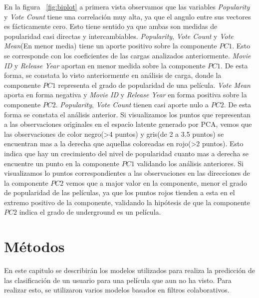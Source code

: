 \documentclass[11pt,a4paper,twoside]{thesis}
\begin{document}
En la figura ~\ref{fig:biplot} a primera vista observamos que las variables \textit{Popularity} y \textit{Vote Count} tiene una correlación muy alta, ya que el angulo entre sus vectores es fácticamente cero. Esto tiene sentido ya que ambas son medidas de popularidad casi directas y intercambiables. \textit{Popularity}, \textit{Vote Count} y \textit{Vote Mean}(En menor media) tiene un aporte positivo sobre la componente $PC1$. Esto se corresponde con los coeficientes de las cargas analizados anteriormente. \textit{Movie ID } y \textit{Release Year} aportan en menor medida sobre la componente $PC1$. De esta forma, se constata lo visto anteriormente en análisis de carga, donde la componente $PC1$ representa el grado de popularidad de una película. \textit{Vote Mean} aporta en forma negativa y \textit{Movie ID } y \textit{Release Year} en forma positiva sobre la componente $PC2$. \textit{Popularity}, \textit{Vote Count} tienen casi aporte nulo a $PC2$. De esta forma se constata el análisis anterior. Si visualizamos los puntos que representan a las observaciones originales en el espacio latente generado por PCA, vemos que las observaciones de color negro(>4 puntos) y gris(de 2 a 3.5 puntos) se encuentran mas a la derecha que aquellas coloreadas en rojo(>2 puntos). Esto indica que hay un crecimiento del nivel de popularidad cuanto mas a derecha se encuentre un punto en la componente $PC1$ validando los análisis anteriores. Si visualizamos lo puntos correspondientes a las observaciones en las direcciones de la componente $PC2$ vemos que a major valor en la componente, menor el grado de popularidad de las películas, ya que los puntos rojos tienden a esta en el extremo positivo de la componente, validando la hipótesis de que la componente $PC2$ indica el grado de underground es un película.



\chapter{Métodos}

En este capitulo se describirán los modelos utilizados para realiza la predicción de las clasificación de un usuario para una película que aun no ha visto. Para realizar esto, se utilizaron varios modelos basados en filtros colaborativos. 
\end{document}
